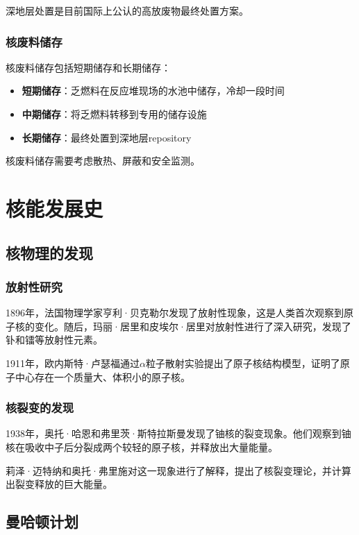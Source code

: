 \documentclass[12pt,UTF8]{ctexbook}
\begin{document}
深地层处置是目前国际上公认的高放废物最终处置方案。

\section{核废料储存}

核废料储存包括短期储存和长期储存：

\begin{itemize}[leftmargin=2cm]
    \item \textbf{短期储存}：乏燃料在反应堆现场的水池中储存，冷却一段时间
    \item \textbf{中期储存}：将乏燃料转移到专用的储存设施
    \item \textbf{长期储存}：最终处置到深地层repository
\end{itemize}

核废料储存需要考虑散热、屏蔽和安全监测。

\part{核能发展史}

\chapter{核物理的发现}

\section{放射性研究}

1896年，法国物理学家亨利·贝克勒尔发现了放射性现象，这是人类首次观察到原子核的变化。随后，玛丽·居里和皮埃尔·居里对放射性进行了深入研究，发现了钋和镭等放射性元素。

1911年，欧内斯特·卢瑟福通过$\alpha$粒子散射实验提出了原子核结构模型，证明了原子中心存在一个质量大、体积小的原子核。

\section{核裂变的发现}

1938年，奥托·哈恩和弗里茨·斯特拉斯曼发现了铀核的裂变现象。他们观察到铀核在吸收中子后分裂成两个较轻的原子核，并释放出大量能量。

莉泽·迈特纳和奥托·弗里施对这一现象进行了解释，提出了核裂变理论，并计算出裂变释放的巨大能量。

\chapter{曼哈顿计划}
\end{document}
